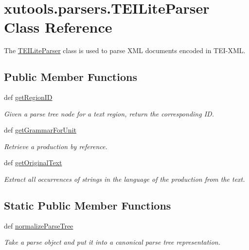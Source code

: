 \hypertarget{classxutools_1_1parsers_1_1_t_e_i_lite_parser}{\section{xutools.\-parsers.\-T\-E\-I\-Lite\-Parser Class Reference}
\label{classxutools_1_1parsers_1_1_t_e_i_lite_parser}
}


The \hyperlink{classxutools_1_1parsers_1_1_t_e_i_lite_parser}{T\-E\-I\-Lite\-Parser} class is used to parse X\-M\-L documents encoded in T\-E\-I-\/\-X\-M\-L.  


\subsection*{Public Member Functions}
\begin{DoxyCompactItemize}
\item 
def \hyperlink{classxutools_1_1parsers_1_1_t_e_i_lite_parser_a348bf296605daf393736c662b16a08c1}{get\-Region\-I\-D}
\begin{DoxyCompactList}\small\item\em Given a parse tree node for a text region, return the corresponding I\-D. \end{DoxyCompactList}\item 
def \hyperlink{classxutools_1_1parsers_1_1_t_e_i_lite_parser_a10b1d4cbbf944450675553699e1fe936}{get\-Grammar\-For\-Unit}
\begin{DoxyCompactList}\small\item\em Retrieve a production by reference. \end{DoxyCompactList}\item 
def \hyperlink{classxutools_1_1parsers_1_1_t_e_i_lite_parser_a3afa1379522156059318357c4f8384e2}{get\-Original\-Text}
\begin{DoxyCompactList}\small\item\em Extract all occurrences of strings in the language of the production from the text. \end{DoxyCompactList}\end{DoxyCompactItemize}
\subsection*{Static Public Member Functions}
\begin{DoxyCompactItemize}
\item 
def \hyperlink{classxutools_1_1parsers_1_1_t_e_i_lite_parser_a3574a39d7821cb7619645be411bcca22}{normalize\-Parse\-Tree}
\begin{DoxyCompactList}\small\item\em Take a parse object and put it into a canonical parse tree representation. \end{DoxyCompactList}\end{DoxyCompactItemize}

